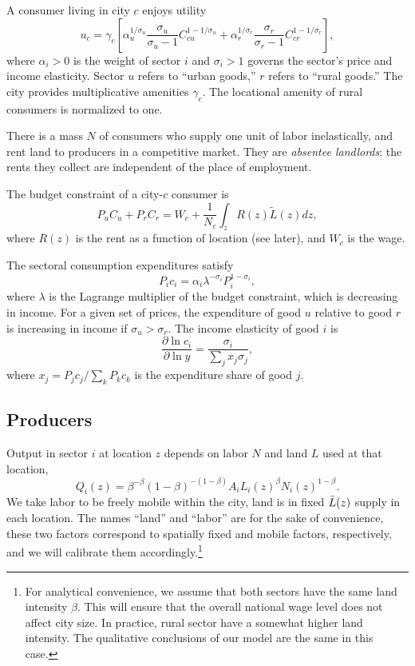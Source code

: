 \documentclass[12pt]{article}
\begin{document}
A consumer living in city $c$ enjoys utility
\begin{equation}
\label{eq:Utility}
u_c = \gamma_c\left[
\alpha_u^{1/\sigma_u}
	\frac {\sigma_u}
			{\sigma_u-1}
	C_{cu}^{1-1/\sigma_u}
	+
	\alpha_r^{1/\sigma_r}
	\frac {\sigma_r}
			{\sigma_r-1}
	C_{cr}^{1-1/\sigma_r}
	\right],
\end{equation}
where $\alpha_i>0$ is the weight of sector $i$ and $\sigma_i>1$ governs the sector's price and income elasticity. Sector $u$ refers to ``urban goods,'' $r$ refers to ``rural goods.'' The city provides multiplicative amenities $\gamma_c$. The locational amenity of rural consumers is normalized to one.

There is a mass $N$ of consumers who supply one unit of labor inelastically, and rent land to producers in a competitive market. They are \emph{absentee landlords}: the rents they collect are independent of the place of employment.

The budget constraint of a city-$c$ consumer is
\begin{equation}
\label{eq:BudCons}
P_u C_u + P_r C_r
	= W_c
	+ \frac 1{N_c} \int_z R(z)\tilde{L}(z)dz,
\end{equation}
where $R(z)$ is the rent as a function of location (see later), and $W_c$ is the wage. 

The sectoral consumption expenditures satisfy
\begin{equation}\label{eq:ConsShares}
{P_i c_i}
=
\alpha_i
\lambda^{ - \sigma_i}
{ P_i^{1-\sigma_i}},
\end{equation}
where $\lambda$ is the Lagrange multiplier of the budget constraint, which is decreasing in income. For a given set of prices, the expenditure of good $u$ relative to good $r$ is increasing in income if $\sigma_u>\sigma_r$.
The income elasticity of good $i$ is
\begin{equation}\label{eq:income_elasticity}
\frac 	{\partial \ln c_i}
		{\partial \ln y}
=
\frac 	{\sigma_i}
		{\sum_j x_j\sigma_j},
\end{equation}
where $x_j=P_jc_j/\sum_k P_kc_k$ is the expenditure share of good $j$.


\subsection{Producers}
Output in sector $i$ at location $z$ depends on labor $N$ and land $L$ used at that location,
\[
Q_i(z) =\beta^{-\beta}(1-\beta)^{-(1-\beta)} A_i L_i(z)^{\beta}N_i(z)^{1-\beta}.
\]
We take labor to be freely mobile within the city, land is in fixed $\Bar{L}(z)$ supply in each location. The names ``land'' and ``labor'' are for the sake of convenience, these two factors correspond to spatially fixed and mobile factors, respectively, and we will calibrate them accordingly.\footnote{For analytical convenience, we assume that both sectors have the same land intensity $\beta$. This will ensure that the overall national wage level does not affect city size. In practice, rural sector have a somewhat higher land intensity. The qualitative conclusions of our model are the same in this case.}
\end{document}
